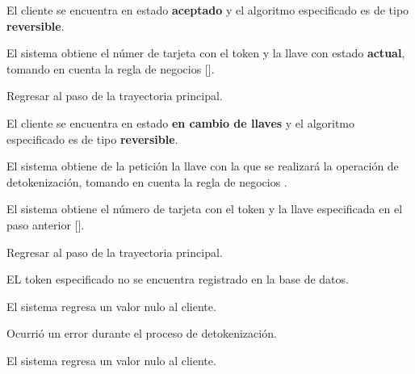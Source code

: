 {\begin{trayectoriaAlternativa}
  \end{trayectoriaAlternativa}

  \begin{trayectoriaAlternativa}
    {El cliente se encuentra en estado \textbf{aceptado} y el algoritmo
    especificado es de tipo \textbf{reversible}.}

    \item El sistema obtiene el númer de tarjeta con el token y la llave
      con estado \textbf{actual}, tomando en cuenta la regla de negocios
      [].

    \item Regresar al paso  de la trayectoria
      principal.

  \end{trayectoriaAlternativa}

  \begin{trayectoriaAlternativa}
    {El cliente se encuentra en estado \textbf{en cambio de llaves} y el
    algoritmo especificado es de tipo \textbf{reversible}.}

    \item El sistema obtiene de la petición la llave con la que se realizará
      la operación de detokenización, tomando en cuenta la regla de negocios
      .

    \item El sistema obtiene el número de tarjeta con el token y la llave
      especificada en el paso anterior
      [].

    \item Regresar al paso  de la trayectoria
      principal.

  \end{trayectoriaAlternativa}

  \begin{trayectoriaAlternativa}
    {EL token especificado no se encuentra registrado en la base de datos.}

    \item El sistema regresa un valor nulo al cliente.

  \end{trayectoriaAlternativa}

  \begin{trayectoriaAlternativa}
    {Ocurrió un error durante el proceso de detokenización.}

    \item El sistema regresa un valor nulo al cliente.

  \end{trayectoriaAlternativa}
}
